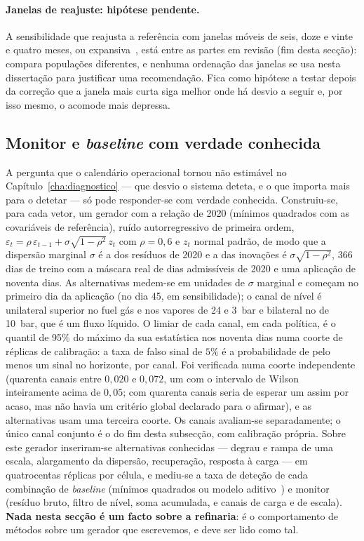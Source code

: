 \paragraph{Janelas de reajuste: hipótese pendente.} A sensibilidade que
reajusta a referência com janelas móveis de seis, doze e vinte e quatro
meses, ou expansiva~\cite{PesaranTimmermann2007}, está entre as partes em
revisão (fim desta secção): compara populações diferentes, e nenhuma
ordenação das janelas se usa nesta dissertação para justificar uma
recomendação. Fica como hipótese a testar depois da correção que a janela
mais curta siga melhor onde há desvio a seguir e, por isso mesmo, o
acomode mais depressa.

\subsection{Monitor e \emph{baseline} com verdade conhecida}
\label{sec:verdade-conhecida}

A pergunta que o calendário operacional tornou não estimável no
Capítulo~\ref{cha:diagnostico} --- que desvio o sistema deteta, e o que
importa mais para o detetar --- só pode responder-se com verdade conhecida.
Construiu-se, para cada vetor, um gerador com a relação de 2020 (mínimos
quadrados com as covariáveis de referência), ruído autorregressivo de
primeira ordem, $\varepsilon_t = \rho\,\varepsilon_{t-1} + \sigma\sqrt{1-\rho^2}\,z_t$
com $\rho = 0{,}6$ e $z_t$ normal padrão, de modo que a dispersão marginal
$\sigma$ é a dos resíduos de 2020 e a das inovações é $\sigma\sqrt{1-\rho^2}$,
366 dias de treino com a máscara real de dias admissíveis de 2020 e uma
aplicação de noventa dias. As alternativas medem-se em unidades de $\sigma$
marginal e começam no primeiro dia da aplicação (no dia 45, em
sensibilidade); o canal de nível é unilateral superior no fuel gás e nos
vapores de 24 e 3~bar e bilateral no de 10~bar, que é um fluxo líquido. O
limiar de cada canal, em cada política, é o quantil de 95\% do máximo da
sua estatística nos noventa dias numa coorte de réplicas de calibração: a
taxa de falso sinal de $5\%$ é a probabilidade de pelo menos um sinal no
horizonte, por canal. Foi verificada numa coorte independente (quarenta
canais entre $0{,}020$ e $0{,}072$, um com o intervalo de
Wilson~\cite{Wilson1927} inteiramente acima de $0{,}05$; com quarenta canais
seria de esperar um assim por acaso, mas não havia um critério global
declarado para o afirmar), e as alternativas usam uma terceira coorte. Os
canais avaliam-se separadamente; o único canal conjunto é o do fim desta
subsecção, com calibração própria. Sobre este gerador inseriram-se
alternativas conhecidas --- degrau e rampa de uma escala, alargamento da
dispersão, recuperação, resposta à carga --- em quatrocentas réplicas por
célula, e mediu-se a taxa de deteção de cada combinação de \emph{baseline}
(mínimos quadrados ou modelo aditivo~\cite{HastieTibshirani1986,Wood2017}) e
monitor (resíduo bruto, filtro de
nível, soma acumulada, e canais de carga e de escala). \textbf{Nada nesta
secção é um facto sobre a refinaria}: é o comportamento de métodos sobre um
gerador que escrevemos, e deve ser lido como tal.

